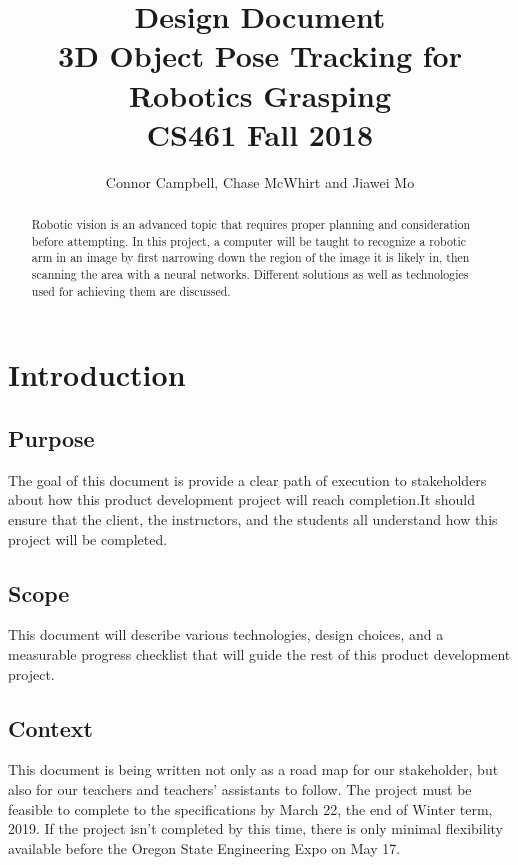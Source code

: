 \documentclass[10pt,journal,compsoc, draftclsnofoot,onecolumn]{IEEEtran}
\begin{document}
\title{Design Document\\ 3D Object Pose Tracking for Robotics Grasping \\ CS461 Fall 2018}
\author{Connor Campbell, Chase McWhirt and Jiawei Mo}

\maketitle

\begin{abstract}
Robotic vision is an advanced topic that requires proper planning and consideration before attempting. In this project, a computer will be taught to recognize a robotic arm in an image by first narrowing down the region of the image it is likely in, then scanning the area with a neural networks. Different solutions as well as technologies used for achieving them are discussed.
\end{abstract}

\IEEEdisplaynontitleabstractindextext
\IEEEpeerreviewmaketitle

\newpage
\pagebreak
\tableofcontents
\pagebreak

\section{Introduction}
\subsection{Purpose}
The goal of this document is provide a clear path of execution to stakeholders about how this product development project will reach completion.It should ensure that the client, the instructors, and the students all understand how this project will be completed.

\subsection{Scope}
This document will describe various technologies, design choices, and a measurable progress checklist that will guide the rest of this product development project.

\subsection{Context}
This document is being written not only as a road map for our stakeholder, but also for our teachers and teachers' assistants to follow. The project must be feasible to complete to the specifications by March 22, the end of Winter term, 2019. If the project isn't completed by this time, there is only minimal flexibility available before the Oregon State Engineering Expo on May 17.
\end{document}
